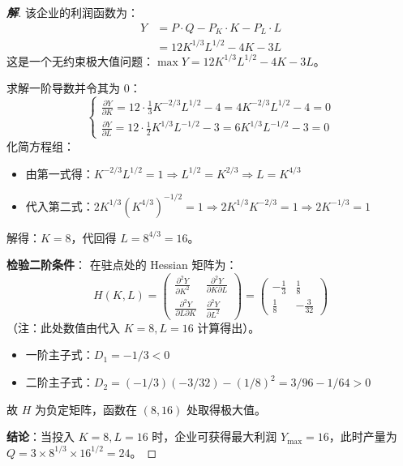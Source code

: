\documentclass[a4paper,12pt]{ctexart} %
\newenvironment{solution}{\begin{proof}[\textbf{解}]}{\end{proof}}
\begin{document}
	\begin{solution}
		该企业的利润函数为：
		\[ 
		\begin{aligned}
			Y &= P \cdot Q - P_K \cdot K - P_L \cdot L \\
			&= 12K^{1/3}L^{1/2} - 4K - 3L
		\end{aligned}
		\]
		这是一个无约束极大值问题：$\max Y = 12K^{1/3}L^{1/2} - 4K - 3L$。
		
		求解一阶导数并令其为 0：
		\[
		\begin{cases}
			\frac{\partial Y}{\partial K} = 12 \cdot \frac{1}{3} K^{-2/3} L^{1/2} - 4 = 4K^{-2/3}L^{1/2} - 4 = 0 \\
			\frac{\partial Y}{\partial L} = 12 \cdot \frac{1}{2} K^{1/3} L^{-1/2} - 3 = 6K^{1/3}L^{-1/2} - 3 = 0
		\end{cases}
		\]
		化简方程组：
		\begin{itemize}
			\item 由第一式得：$K^{-2/3}L^{1/2} = 1 \Rightarrow L^{1/2} = K^{2/3} \Rightarrow L = K^{4/3}$
			\item 代入第二式：$2K^{1/3}(K^{4/3})^{-1/2} = 1 \Rightarrow 2K^{1/3}K^{-2/3} = 1 \Rightarrow 2K^{-1/3} = 1$
		\end{itemize}
		解得：$K = 8$，代回得 $L = 8^{4/3} = 16$。
		
		\textbf{检验二阶条件}：
		在驻点处的 Hessian 矩阵为：
		\[
		H(K, L) = \begin{pmatrix} 
			\frac{\partial^2 Y}{\partial K^2} & \frac{\partial^2 Y}{\partial K \partial L} \\
			\frac{\partial^2 Y}{\partial L \partial K} & \frac{\partial^2 Y}{\partial L^2}
		\end{pmatrix}
		= \begin{pmatrix}
			-\frac{1}{3} & \frac{1}{8} \\
			\frac{1}{8} & -\frac{3}{32}
		\end{pmatrix}
		\]
		（注：此处数值由代入 $K=8, L=16$ 计算得出）。
		
		\begin{itemize}
			\item 一阶主子式：$D_1 = -1/3 < 0$
			\item 二阶主子式：$D_2 = (-1/3)(-3/32) - (1/8)^2 = 3/96 - 1/64 > 0$
		\end{itemize}
		故 $H$ 为负定矩阵，函数在 $(8, 16)$ 处取得极大值。
		
		\textbf{结论}：当投入 $K=8, L=16$ 时，企业可获得最大利润 $Y_{\max}=16$，此时产量为 $Q = 3 \times 8^{1/3} \times 16^{1/2} = 24$。
	\end{solution}
	
\end{document}
